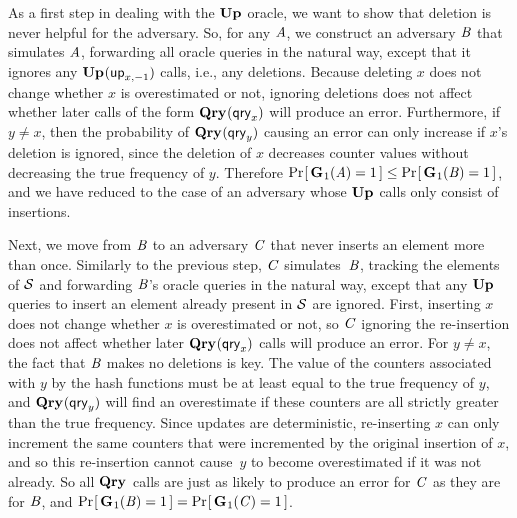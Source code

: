 As a first step in dealing with the $\textup{\textbf{Up}}\hspace{0.5pt}$ oracle, we want to show that deletion
is never helpful for the adversary. So, for any $\mathit{A}$, we construct an
adversary $\mathit{B}$ that simulates $\mathit{A}$, forwarding all oracle queries in the
natural way, except that it ignores any $\textup{\textbf{Up}}\hspace{0.5pt}(\mathsf{up}_{x,-1})$ calls, i.e., any
deletions. Because deleting $x$ does not change whether $x$ is overestimated or
not, ignoring deletions does not affect whether later calls of the form
$\textup{\textbf{Qry}}\hspace{0.5pt}(\mathsf{qry}_x)$ will produce an error. Furthermore, if $y \neq x$, then the
probability of $\textup{\textbf{Qry}}\hspace{0.5pt}(\mathsf{qry}_y)$ causing an error can only increase if $x$'s
deletion is ignored, since the deletion of $x$ decreases counter values without
decreasing the true frequency of $y$. Therefore
$\Pr\hspace{-1pt}\left[\,\textup{\textbf{G}}\hspace{0.5pt}_1(\mathit{A}) = 1\,\right] \le \Pr\hspace{-1pt}\left[\,\textup{\textbf{G}}\hspace{0.5pt}_1(\mathit{B}) = 1\,\right]$, and we have reduced
to the case of an adversary whose $\textup{\textbf{Up}}\hspace{0.5pt}$ calls only consist of insertions.


Next, we move from $\mathit{B}$ to an adversary $\mathit{C}$ that never inserts an element more than
once. Similarly to the previous step, $\mathit{C}$ simulates~$\mathit{B}$, tracking the
elements of $\mathcal{S}$ and forwarding $\mathit{B}$'s oracle queries in
the natural way, except that any $\textup{\textbf{Up}}\hspace{0.5pt}$ queries to insert an element already
present in $\mathcal{S}$ are ignored. First, inserting $x$ does not
change whether $x$ is overestimated or not, so $\mathit{C}$ ignoring the re-insertion
does not affect whether later $\textup{\textbf{Qry}}\hspace{0.5pt}(\mathsf{qry}_x)$ calls will produce an error. For
$y \neq x$, the fact that $\mathit{B}$ makes no deletions is key. The value of the
counters associated with $y$ by the hash functions must be at least equal to the
true frequency of $y$, and $\textup{\textbf{Qry}}\hspace{0.5pt}(\mathsf{qry}_y)$ will find an overestimate if these
counters are all strictly greater than the true frequency. Since updates are
deterministic, re-inserting $x$ can only increment the same counters that were
incremented by the original insertion of $x$, and so this re-insertion cannot
cause~$y$ to become overestimated if it was not already. So all $\textup{\textbf{Qry}}\hspace{0.5pt}$ calls
are just as likely to produce an error for $\mathit{C}$ as they are for $\mathit{B}$, and
$\Pr\hspace{-1pt}\left[\,\textup{\textbf{G}}\hspace{0.5pt}_1(\mathit{B}) = 1\,\right] = \Pr\hspace{-1pt}\left[\,\textup{\textbf{G}}\hspace{0.5pt}_1(\mathit{C}) = 1\,\right]$.

